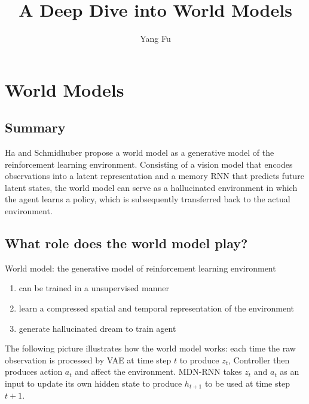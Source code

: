 \documentclass{article}
\title{A Deep Dive into World Models}
\author{Yang Fu}
\date{}
\begin{document}
\maketitle

\begin{abstract}

\end{abstract}

\section{World Models}

\subsection{Summary}

Ha and Schmidhuber \cite{https://doi.org/10.5281/zenodo.1207631} propose a world model as a generative model of the reinforcement learning environment. Consisting of a vision model that encodes observations into a latent representation and a memory RNN that predicts future latent states, the world model can serve as a hallucinated environment in which the agent learns a policy, which is subsequently transferred back to the actual environment.


\subsection{What role does the world model play?}

\noindent World model: the generative model of reinforcement learning environment

\begin{enumerate}[labelindent=\parindent, leftmargin=*]
    \item can be trained in a unsupervised manner
    \item learn a compressed spatial and temporal representation of the environment
    \item generate hallucinated dream to train agent
\end{enumerate}

\noindent The following picture illustrates how the world model works: each time the raw observation is processed by VAE at time step $t$ to produce $z_t$, Controller then produces action $a_t$ and affect the environment. MDN-RNN takes $z_t$ and $a_t$ as an input to update its own hidden state to produce $h_{t+1}$ to be used at time step $t+1$.
\end{document}
